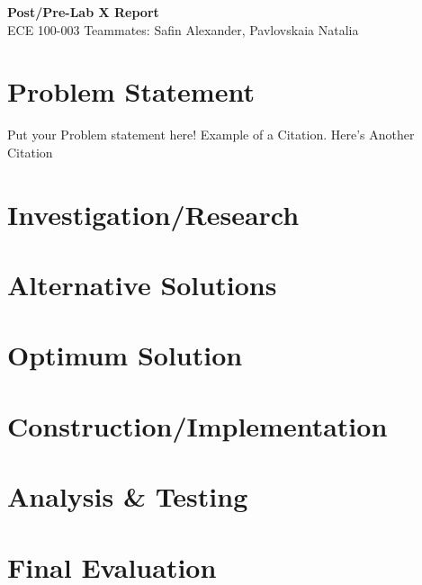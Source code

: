 \documentclass[a4paper, 11pt]{article}
\begin{document}
    \noindent
    \large\textbf{Post/Pre-Lab X Report} \hfill\\
    \normalsize ECE 100-003 \hfill Teammates: Safin Alexander, Pavlovskaia Natalia \\

    \section*{Problem Statement}
    Put your Problem statement here! Example of a Citation\cite[p.219]{Robotics}. Here's Another Citation\cite{Flueck}

    \section*{Investigation/Research}
    \lipsum[2]

    \section*{Alternative Solutions}
    \lipsum[3]

    \section*{Optimum Solution}
    \lipsum[4]

    \section*{Construction/Implementation}
    \lipsum[5]

    \section*{Analysis \& Testing}
    \lipsum[6]

    \section*{Final Evaluation}
    \lipsum[7]
\end{document}
